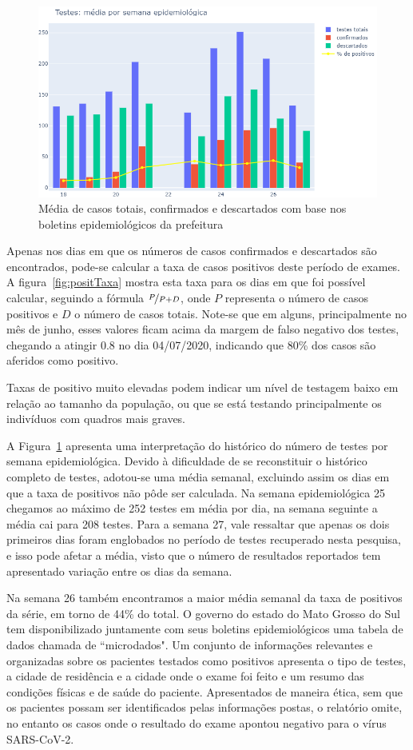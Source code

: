 \documentclass[12pt]{article}
\begin{document}
\begin{figure}[!htb]
  \centering
  \includegraphics[width=.75\textwidth]{figs/media_cof_desc.png}
  \caption{Média de casos totais, confirmados e descartados com base nos boletins epidemiológicos da prefeitura}
  \label{fig:medTeste}
  \end{figure}

Apenas nos dias em que os números de casos confirmados e descartados são encontrados, pode-se calcular a taxa de casos positivos deste período de exames. A figura~\ref{fig:positTaxa} mostra esta taxa para os dias em que foi possível calcular, seguindo a fórmula \( \nicefrac{P}{P+D}\), onde \(P\) representa o número de casos positivos e \(D\) o número de casos totais. Note-se que em alguns, principalmente no mês de junho, esses valores ficam acima da margem de falso negativo dos testes, chegando a atingir \(0.8\) no dia 04/07/2020, indicando que 80\% dos casos são aferidos como positivo.

Taxas de positivo muito elevadas podem indicar um nível de testagem baixo em relação ao tamanho da população, ou que se está testando principalmente os indivíduos com quadros mais graves.

A Figura~\ref{fig:medTeste} apresenta uma interpretação do histórico do número de testes por semana epidemiológica. Devido à dificuldade de se reconstituir o histórico completo de testes, adotou-se uma média semanal, excluindo assim os dias em que a taxa de positivos não pôde ser calculada. Na semana epidemiológica 25 chegamos ao máximo de 252 testes em média por dia, na semana seguinte a média cai para 208 testes. Para a semana 27, vale ressaltar que apenas os dois primeiros dias foram englobados no período de testes recuperado nesta pesquisa, e isso pode afetar a média, visto que o número de resultados reportados tem apresentado variação entre os dias da semana.

Na semana 26 também encontramos a maior média semanal da taxa de positivos da série, em torno de 44\% do total. O governo do estado do Mato Grosso do Sul tem disponibilizado juntamente com seus boletins epidemiológicos \cite{BoletinsMS} uma tabela de dados chamada de ``microdados". Um conjunto de informações relevantes e organizadas sobre os pacientes testados como positivos apresenta o tipo de testes, a cidade de residência e a cidade onde o exame foi feito e um resumo das condições físicas e de saúde do paciente. Apresentados de maneira ética, sem que os pacientes possam ser identificados pelas informações postas, o relatório omite, no entanto os casos onde o resultado do exame apontou negativo para o vírus SARS-CoV-2.
\end{document}
